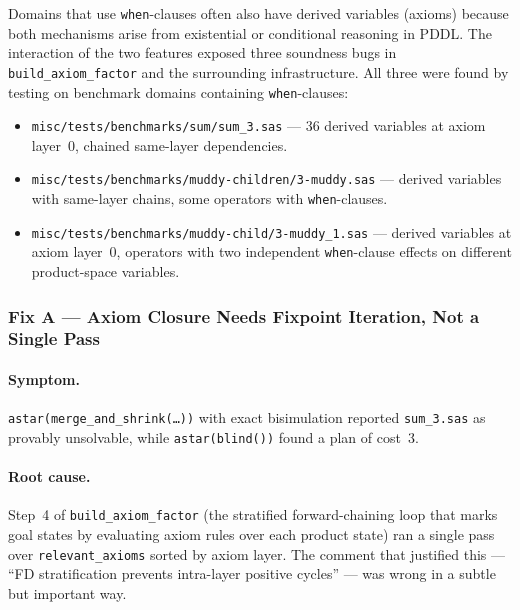 \documentclass[11pt,a4paper]{article}
\begin{document}
Domains that use \texttt{when}-clauses often also have derived variables
(axioms) because both mechanisms arise from existential or conditional
reasoning in PDDL.  The interaction of the two features exposed three
soundness bugs in \texttt{build\_axiom\_factor} and the surrounding
infrastructure.  All three were found by testing on benchmark domains
containing \texttt{when}-clauses:

\begin{itemize}
  \item \texttt{misc/tests/benchmarks/sum/sum\_3.sas} — 36 derived
    variables at axiom layer~0, chained same-layer dependencies.
  \item \texttt{misc/tests/benchmarks/muddy-children/3-muddy.sas} — derived
    variables with same-layer chains, some operators with \texttt{when}-clauses.
  \item \texttt{misc/tests/benchmarks/muddy-child/3-muddy\_1.sas} — derived
    variables at axiom layer~0, operators with two independent
    \texttt{when}-clause effects on different product-space variables.
\end{itemize}

\subsubsection{Fix A — Axiom Closure Needs Fixpoint Iteration, Not a Single
Pass}
\label{sec:fix-a}

\paragraph{Symptom.}
\texttt{astar(merge\_and\_shrink(\ldots))} with exact bisimulation reported
\texttt{sum\_3.sas} as provably unsolvable, while \texttt{astar(blind())}
found a plan of cost~3.

\paragraph{Root cause.}
Step~4 of \texttt{build\_axiom\_factor} (the stratified forward-chaining
loop that marks goal states by evaluating axiom rules over each product
state) ran a single pass over \texttt{relevant\_axioms} sorted by axiom
layer.  The comment that justified this --- ``FD stratification prevents
intra-layer positive cycles'' --- was wrong in a subtle but important way.
\end{document}
